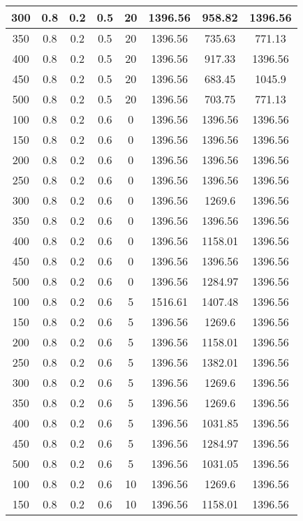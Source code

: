 \documentclass[a4paper, 12pt]{extreport}
\begin{document}
\begin{itemize}
\begin{longtable}{|c|c|c|c|c|c|c|c|}
			300 & 0.8 & 0.2 & 0.5 & 20 & 1396.56 & 958.82 & 1396.56 \\\hline
			350 & 0.8 & 0.2 & 0.5 & 20 & 1396.56 & 735.63 & 771.13 \\\hline
			400 & 0.8 & 0.2 & 0.5 & 20 & 1396.56 & 917.33 & 1396.56 \\\hline
			450 & 0.8 & 0.2 & 0.5 & 20 & 1396.56 & 683.45 & 1045.9 \\\hline
			500 & 0.8 & 0.2 & 0.5 & 20 & 1396.56 & 703.75 & 771.13 \\\hline
			100 & 0.8 & 0.2 & 0.6 & 0 & 1396.56 & 1396.56 & 1396.56 \\\hline
			150 & 0.8 & 0.2 & 0.6 & 0 & 1396.56 & 1396.56 & 1396.56 \\\hline
			200 & 0.8 & 0.2 & 0.6 & 0 & 1396.56 & 1396.56 & 1396.56 \\\hline
			250 & 0.8 & 0.2 & 0.6 & 0 & 1396.56 & 1396.56 & 1396.56 \\\hline
			300 & 0.8 & 0.2 & 0.6 & 0 & 1396.56 & 1269.6 & 1396.56 \\\hline
			350 & 0.8 & 0.2 & 0.6 & 0 & 1396.56 & 1396.56 & 1396.56 \\\hline
			400 & 0.8 & 0.2 & 0.6 & 0 & 1396.56 & 1158.01 & 1396.56 \\\hline
			450 & 0.8 & 0.2 & 0.6 & 0 & 1396.56 & 1396.56 & 1396.56 \\\hline
			500 & 0.8 & 0.2 & 0.6 & 0 & 1396.56 & 1284.97 & 1396.56 \\\hline
			100 & 0.8 & 0.2 & 0.6 & 5 & 1516.61 & 1407.48 & 1396.56 \\\hline
			150 & 0.8 & 0.2 & 0.6 & 5 & 1396.56 & 1269.6 & 1396.56 \\\hline
			200 & 0.8 & 0.2 & 0.6 & 5 & 1396.56 & 1158.01 & 1396.56 \\\hline
			250 & 0.8 & 0.2 & 0.6 & 5 & 1396.56 & 1382.01 & 1396.56 \\\hline
			300 & 0.8 & 0.2 & 0.6 & 5 & 1396.56 & 1269.6 & 1396.56 \\\hline
			350 & 0.8 & 0.2 & 0.6 & 5 & 1396.56 & 1269.6 & 1396.56 \\\hline
			400 & 0.8 & 0.2 & 0.6 & 5 & 1396.56 & 1031.85 & 1396.56 \\\hline
			450 & 0.8 & 0.2 & 0.6 & 5 & 1396.56 & 1284.97 & 1396.56 \\\hline
			500 & 0.8 & 0.2 & 0.6 & 5 & 1396.56 & 1031.05 & 1396.56 \\\hline
			100 & 0.8 & 0.2 & 0.6 & 10 & 1396.56 & 1269.6 & 1396.56 \\\hline
			150 & 0.8 & 0.2 & 0.6 & 10 & 1396.56 & 1158.01 & 1396.56 \\\hline

\end{longtable}
\end{itemize}
\end{document}
